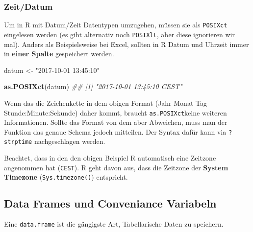 \documentclass[]{book}
\newenvironment{Shaded}{\begin{snugshade}}{\end{snugshade}}
\newcommand{\CommentTok}[1]{\textcolor[rgb]{0.56,0.35,0.01}{\textit{#1}}}
\newcommand{\DataTypeTok}[1]{\textcolor[rgb]{0.13,0.29,0.53}{#1}}
\newcommand{\KeywordTok}[1]{\textcolor[rgb]{0.13,0.29,0.53}{\textbf{#1}}}
\newcommand{\NormalTok}[1]{#1}
\newcommand{\StringTok}[1]{\textcolor[rgb]{0.31,0.60,0.02}{#1}}
\begin{document}
\hypertarget{zeitdatum}{%
\subsubsection{Zeit/Datum}\label{zeitdatum}}

Um in R mit Datum/Zeit Datentypen umzugehen, müssen sie als \texttt{POSIXct} eingelesen werden (es gibt alternativ noch \texttt{POSIXlt}, aber diese ignorieren wir mal). Anders als Beispielsweise bei Excel, sollten in R Datum und Uhrzeit immer in \textbf{einer Spalte} gespeichert werden.

\begin{Shaded}
\begin{Highlighting}[]
\NormalTok{datum <-}\StringTok{ "2017-10-01 13:45:10"}

\KeywordTok{as.POSIXct}\NormalTok{(datum)}
\CommentTok{## [1] "2017-10-01 13:45:10 CEST"}
\end{Highlighting}
\end{Shaded}

Wenn das die Zeichenkette in dem obigen Format (Jahr-Monat-Tag Stunde:Minute:Sekunde) daher kommt, braucht \texttt{as.POSIXct}keine weiteren Informationen. Sollte das Format von dem aber Abweichen, muss man der Funktion das genaue Schema jedoch mitteilen. Der Syntax dafür kann via \texttt{?strptime} nachgeschlagen werden.

\begin{Shaded}
\end{Shaded}

Beachtet, dass in den den obigen Beispiel R automatisch eine Zeitzone angenommen hat (\texttt{CEST}). R geht davon aus, dass die Zeitzone der \textbf{System Timezone} (\texttt{Sys.timezone()}) entspricht.

\hypertarget{data-frames-und-conveniance-variabeln}{%
\subsection{Data Frames und Conveniance Variabeln}\label{data-frames-und-conveniance-variabeln}}

Eine \texttt{data.frame} ist die gängigste Art, Tabellarische Daten zu speichern.
\end{document}
